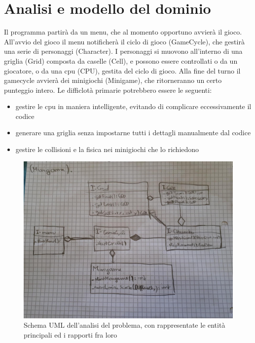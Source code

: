 \documentclass[a4paper,12pt]{report}
\begin{document}
\section{Analisi e modello del dominio}

Il programma partirà da un menu, che al momento opportuno avvierà il gioco.
%
All'avvio del gioco il menu notificherà il ciclo di gioco (GameCycle), che gestirà una serie di personaggi (Character).
%
I personaggi si muovono all'interno di una griglia (Grid) composta da caselle (Cell), e possono essere controllati o da un giocatore, o da una cpu (CPU), gestita del ciclo di gioco.
%
Alla fine del turno il gamecycle avvierà dei minigiochi (Minigame), che ritorneranno un certo punteggio intero.
%
Le difficlotà primarie potrebbero essere le seguenti:
\begin{itemize}
    \item gestire le cpu in maniera intelligente, evitando di complicare eccessivamente il codice
    \item generare una griglia senza impostarne tutti i dettagli manualmente dal codice
    \item gestire le collisioni e la fisica nei minigiochi che lo richiedono
\end{itemize}

\begin{figure}[!t]
\centering{}
\includegraphics[width=150mm]{images/domain.jpeg}
\caption{Schema UML dell'analisi del problema, con rappresentate le entità principali ed i rapporti fra loro}
\label{img:analysis}
\end{figure}
\end{document}
